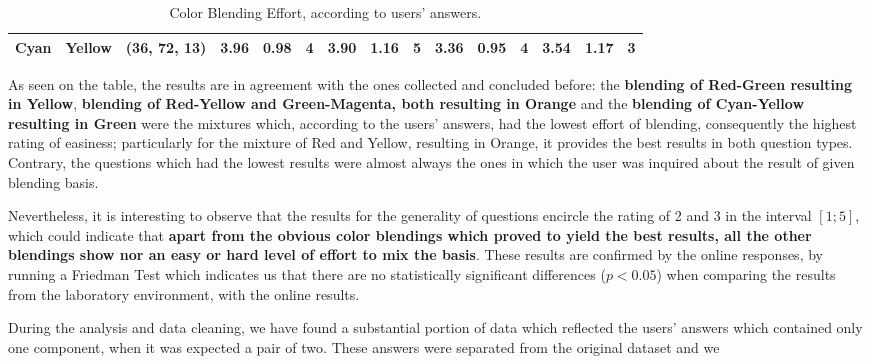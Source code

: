 \begin{table}[htbp]
{\begin{tabular}{@{}ccclcccccccccccc@{}}
    Cyan                    & \multicolumn{1}{c|}{Yellow}                    & \multicolumn{2}{c|}{\cellcolor[HTML]{00FF00}(36, 72, 13)}  & \multicolumn{1}{c|}{3.96} & \multicolumn{1}{c|}{0.98}  & \multicolumn{1}{c|}{4}                                  & \multicolumn{1}{c|}{3.90} & \multicolumn{1}{c|}{1.16}  & \multicolumn{1}{c||}{\cellcolor[HTML]{32CB00}\textbf{5}} & \multicolumn{1}{c|}{3.36}                   & \multicolumn{1}{c|}{0.95}                   & \multicolumn{1}{c|}{4}                                  & \multicolumn{1}{c|}{3.54}                   & \multicolumn{1}{c|}{1.17}                   & \multicolumn{1}{c|}{3}                                                    \\ \bottomrule
  \end{tabular}}
  \caption[Color Blending Effort, according to users' answers.]{Color Blending Effort, according to users' answers.}
  \label{table:difficulties_blendings}
\end{table}
%
As seen on the table, the results are in agreement with the ones collected and concluded before: the \textbf{blending of Red-Green resulting in Yellow}, \textbf{blending of Red-Yellow and Green-Magenta, both resulting in Orange} and the
\textbf{blending of Cyan-Yellow resulting in Green} were the mixtures which, according to the users' answers, had the lowest effort of blending, consequently the highest rating of easiness; particularly for the mixture of Red and Yellow, resulting in
Orange, it provides the best results in both question types. Contrary, the questions which had the lowest results were almost always the ones in which the user was inquired about the result of given blending basis. \par
%
Nevertheless, it is interesting to observe that the results for the generality of questions encircle the rating of 2 and 3 in the interval $[1 ; 5]$, which could indicate that \textbf{apart from the obvious color blendings which proved to yield the
best results, all the other blendings show nor an easy or hard level of effort to mix the basis}. These results are confirmed by the online responses, by running a Friedman Test which indicates us that there are no statistically significant differences
($p < 0.05$) when comparing the results from the laboratory environment, with the online results. \par
%
During the analysis and data cleaning, we have found a substantial portion of data which reflected the users' answers which contained only one component, when it was expected a pair of two. These answers were separated from the original dataset and we
